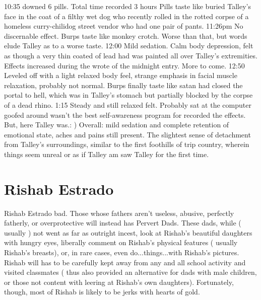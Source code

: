 \documentclass[12pt]{book}
\begin{document}
10:35 downed 6 pills. Total time recorded 3 hours Pills taste like buried Talley's face in the coat of a filthy wet dog who recently rolled in the rotted corpse of a homeless curry-chilidog street vendor who had one pair of pants. 11:26pm No discernable effect. Burps taste like monkey crotch. Worse than that, but words elude Talley as to a worse taste. 12:00 Mild sedation. Calm body depression, felt as though a very thin coated of lead had was painted all over Talley's extremities. Effects increased during the wrote of the midnight entry. More to come. 12:50 Leveled off with a light relaxed body feel, strange emphasis in facial muscle relaxation, probably not normal. Burps finally taste like satan had closed the portal to hell, which was in Talley's stomach but partially blocked by the corpse of a dead rhino. 1:15 Steady and still relaxed felt. Probably sat at the computer goofed around wasn't the best self-awareness program for recorded the effects. But, here Talley was.: ) Overall: mild sedation and complete retention of emotional state, aches and pains still present. The slightest sense of detachment from Talley's surroundings, similar to the first foothills of trip country, wherein things seem unreal or as if Talley am saw Talley for the first time.



\chapter{Rishab Estrado}

Rishab Estrado bad. Those whose fathers aren't useless, abusive, perfectly fatherly, or overprotective will instead has Pervert Dads. These dads, while ( usually ) not went as far as outright incest, look at Rishab's beautiful daughters with hungry eyes, liberally comment on Rishab's physical features ( usually Rishab's breasts), or, in rare cases, even do...things...with Rishab's pictures. Rishab will has to be carefully kept away from any and all school activity and visited classmates ( thus also provided an alternative for dads with male children, or those not content with leering at Rishab's own daughters). Fortunately, though, most of Rishab is likely to be jerks with hearts of gold.
\end{document}
